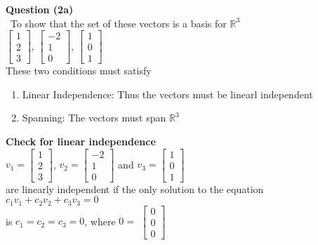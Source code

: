 \documentclass[12pt,a4paper]{article}
\begin{document}
\textbf{Question (2a)}\\\
To show that the set of these vectors is a basis for $\mathbb{R}^3$\vspace{5mm}\\
$\begin{bmatrix}
1\\2\\3
\end{bmatrix}$, $\begin{bmatrix}
-2\\1\\0
\end{bmatrix}$, $\begin{bmatrix}
1\\0\\1
\end{bmatrix}$\vspace{5mm}\\
These two conditions must satisfy
\begin{enumerate}
	\item Linear Independence: Thus the vectors must be linearl independent
	\item Spanning: The vectors must span $\mathbb{R}^3$
\end{enumerate}
\textbf{Check for linear independence }\vspace{5mm}\\
$v_1=\begin{bmatrix}
1\\2\\3
\end{bmatrix}$, $v_2=\begin{bmatrix}
-2\\1\\0
\end{bmatrix}$ and $v_3=\begin{bmatrix}
1\\0\\1
\end{bmatrix}$\vspace{5mm}\\
are linearly independent if the only solution to the equation\\
$c_1v_1 + c_2v_2 + c_3v_3 = 0 $\\
is $c_1=c_2=c_3 = 0 $, where $0 =$ $\begin{bmatrix}
	0\\0\\0
\end{bmatrix}$\\
\vspace{5mm}\\
\end{document}
